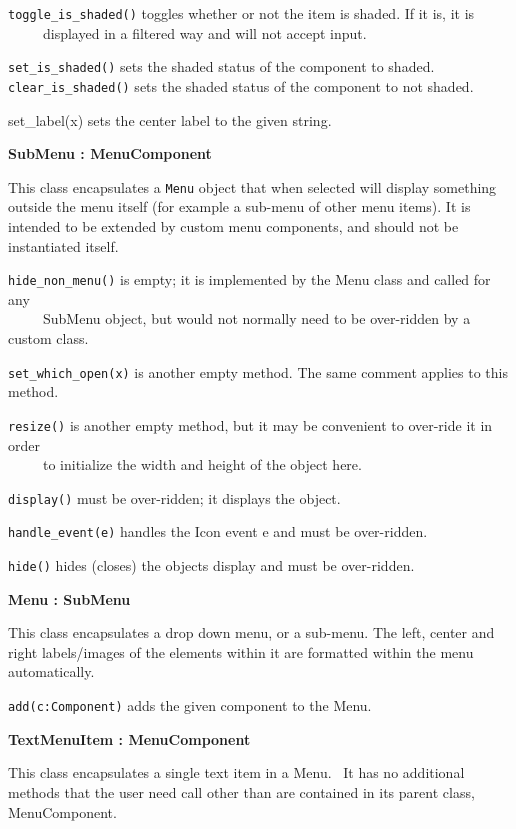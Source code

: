 \texttt{toggle\_is\_shaded()} toggles whether or not the item is shaded. If it
is, it is\\
 \ \ \ \ \ displayed in a filtered way and will not accept input.

\texttt{set\_is\_shaded()} sets the shaded status of the component to
shaded.\\
\texttt{clear\_is\_shaded()} sets the shaded status of the component to not
shaded.

set\_label(x) sets the center label to the given string.

{\ttfamily\bfseries
{}SubMenu : MenuComponent}

This class encapsulates a \texttt{Menu} object that when selected will
display something outside the menu itself (for example a sub-menu of
other menu items). It is intended to be extended by custom menu
components, and should not be instantiated itself.

\texttt{hide\_non\_menu()} is empty; it is implemented by the Menu class and
called for any\\
 \ \ \ \ \ SubMenu object, but would not normally need to be over-ridden
by a custom class.

\texttt{set\_which\_open(x)} is another empty method. The same comment applies to
this method.

\texttt{resize()} is another empty method, but it may be convenient to over-ride
it in order\\
 \ \ \ \ \ to initialize the width and height of the object here.

\texttt{display()} must be over-ridden; it displays the object.

\texttt{handle\_event(e)} handles the Icon event e and must be over-ridden.

\texttt{hide()} hides (closes) the object{\textquotesingle}s display and must be
over-ridden.

{\ttfamily\bfseries
{}Menu : SubMenu}

This class encapsulates a drop down menu, or a sub-menu. The left,
center and right labels/images of the elements within it are formatted
within the menu automatically.

\texttt{add(c:Component)} adds the given component to the Menu.

{\ttfamily\bfseries
TextMenuItem : MenuComponent}

This class encapsulates a single text item in a Menu. \ It has no
additional methods that the user need call other than are contained in
its parent class, MenuComponent.

